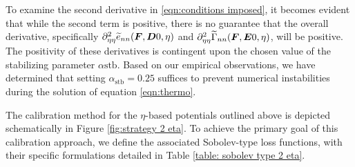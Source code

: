 To examine the second derivative in \eqref{eqn:conditions imposed}, it becomes evident that while the second term is positive, there is no guarantee that the overall derivative, specifically $\partial^2_{\eta\eta}\widetilde{e}_{nn}(\boldsymbol{F},\boldsymbol{D}0,\eta)$ and $\partial^2_{\eta\eta}\widetilde{\Gamma}_{nn}(\boldsymbol{F},\boldsymbol{E}0,\eta)$, will be positive. The positivity of these derivatives is contingent upon the chosen value of the stabilizing parameter $\alpha{\text{stb}}$. Based on our empirical observations, we have determined that setting $\alpha_{\text{stb}} = 0.25$ suffices to prevent numerical instabilities during the solution of equation \eqref{eqn:thermo}.

The calibration method for the $\eta$-based potentials outlined above is depicted schematically in Figure \ref{fig:strategy 2 eta}. To achieve the primary goal of this calibration approach, we define the associated Sobolev-type loss functions, with their specific formulations detailed in Table \ref{table: sobolev type 2 eta}.








